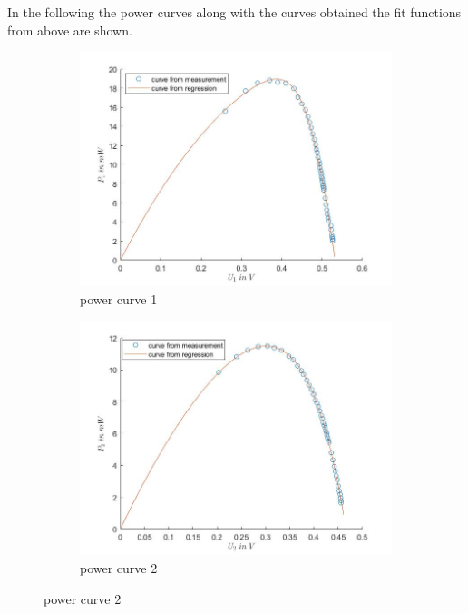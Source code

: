 \documentclass[a4paper, 12pt]{scrartcl}
\begin{document}
\newpage
In the following the power curves along with the curves obtained the fit functions from above are shown.
\begin{figure}[H]\centering
\begin{adjustwidth}{-1em}{7em}
  \begin{subfigure}[b]{0.5\textwidth}
    \includegraphics[width=\textwidth]{P1}
    \caption{power curve 1}
    \label{fig:}
  \end{subfigure}
  \begin{subfigure}[b]{0.5\textwidth}
    \includegraphics[width=\textwidth]{P2}
    \caption{power curve 2}
    \label{fig:}
  \end{subfigure}
\end{adjustwidth}\centering

\end{figure}
\end{document}
